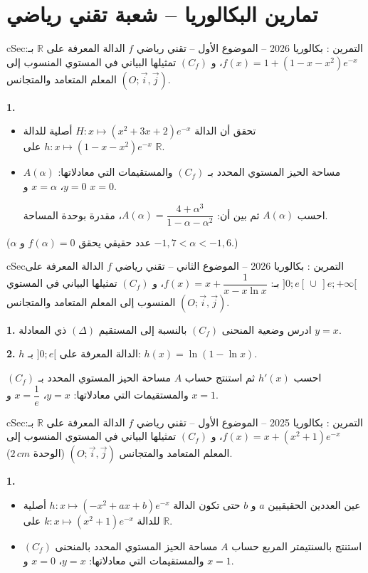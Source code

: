 \documentclass[12pt,a4paper]{article}
\newenvironment{BOX}[2]{\begin{otherlanguage}{english}\begin{arbox}{#1}{#2}}{\end{arbox}\end{otherlanguage}}
\newcounter{exo}
\newenvironment{tamrin}[1]{\stepcounter{exo}\begin{BOX}{cSec}{التمرين \theexo: #1}}{\end{BOX}}
\newcommand{\R}{\mathbb{R}}
\newenvironment{sq}{\begin{itemize}[leftmargin=2.4em,itemsep=3pt]}{\end{itemize}}
\newcommand{\qa}{\item[(أ)]}\newcommand{\qb}{\item[(ب)]}\newcommand{\qc}{\item[(جـ)]}\newcommand{\qd}{\item[(د)]}\newcommand{\qe}{\item[(هـ)]}
\newcommand{\QQ}[1]{\par\smallskip\textbf{#1.} }
\begin{document}
\section{تمارين البكالوريا -- شعبة تقني رياضي}
\begin{tamrin}{بكالوريا 2026 -- الموضوع الأول -- تقني رياضي}
$f$ الدالة المعرفة على $\R$ بـ: $f(x)=1+\left(1-x-x^{2}\right)e^{-x}$، و $(C_f)$ تمثيلها البياني في المستوي المنسوب إلى المعلم المتعامد والمتجانس $(O;\vec{i},\vec{j})$.

\QQ{1}
\begin{sq}
\qa تحقق أن الدالة $H:x\mapsto \left(x^{2}+3x+2\right)e^{-x}$ أصلية للدالة $h:x\mapsto\left(1-x-x^{2}\right)e^{-x}$ على $\R$.
\qb $A(\alpha)$ مساحة الحيز المستوي المحدد بـ $(C_f)$ والمستقيمات التي معادلاتها: $y=0$، $x=\alpha$ و $x=0$.

احسب $A(\alpha)$ ثم بين أن: $A(\alpha)=\dfrac{4+\alpha^{3}}{1-\alpha-\alpha^{2}}$، مقدرة بوحدة المساحة.
\end{sq}
($\alpha$ عدد حقيقي يحقق $f(\alpha)=0$ و $-1{,}7<\alpha<-1{,}6$.)
\end{tamrin}

\begin{tamrin}{بكالوريا 2026 -- الموضوع الثاني -- تقني رياضي}
$f$ الدالة المعرفة على $]0;e[\,\cup\,]e;+\infty[$ بـ: $f(x)=x+\dfrac{1}{x-x\ln x}$، و $(C_f)$ تمثيلها البياني في المستوي المنسوب إلى المعلم المتعامد والمتجانس $(O;\vec{i},\vec{j})$.

\QQ{1} ادرس وضعية المنحنى $(C_f)$ بالنسبة إلى المستقيم $(\Delta)$ ذي المعادلة $y=x$.

\QQ{2} $h$ الدالة المعرفة على $]0;e[$ بـ: $h(x)=\ln(1-\ln x)$.

احسب $h'(x)$ ثم استنتج حساب $A$ مساحة الحيز المستوي المحدد بـ $(C_f)$ والمستقيمات التي معادلاتها: $y=x$، $x=\dfrac{1}{e}$ و $x=1$.
\end{tamrin}

\begin{tamrin}{بكالوريا 2025 -- الموضوع الأول -- تقني رياضي}
$f$ الدالة المعرفة على $\R$ بـ: $f(x)=x+\left(x^{2}+1\right)e^{-x}$، و $(C_f)$ تمثيلها البياني في المستوي المنسوب إلى المعلم المتعامد والمتجانس $(O;\vec{i},\vec{j})$ (الوحدة $2\,cm$).

\QQ{1}
\begin{sq}
\qa عين العددين الحقيقيين $a$ و $b$ حتى تكون الدالة $h:x\mapsto\left(-x^{2}+ax+b\right)e^{-x}$ أصلية للدالة $k:x\mapsto\left(x^{2}+1\right)e^{-x}$ على $\R$.
\qb استنتج بالسنتيمتر المربع حساب $A$ مساحة الحيز المستوي المحدد بالمنحنى $(C_f)$ والمستقيمات التي معادلاتها: $y=x$، $x=0$ و $x=1$.
\end{sq}
\end{tamrin}
\end{document}
